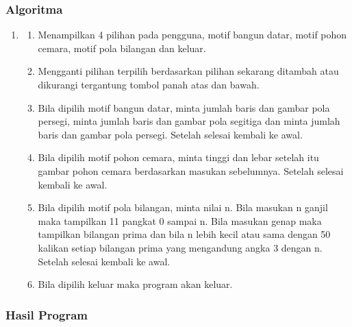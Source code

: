 \documentclass[../main.tex]{subfiles}
\begin{document}
    \subsubsection{Algoritma}
    \begin{enumerate}
        \item []
        \begin{enumerate}
            \item{Menampilkan 4 pilihan pada pengguna, motif bangun datar, motif pohon cemara, motif pola bilangan dan keluar.}
            \item{Mengganti pilihan terpilih berdasarkan pilihan sekarang ditambah atau dikurangi tergantung tombol panah atas dan bawah.}
            \item{Bila dipilih motif bangun datar, minta jumlah baris dan gambar pola persegi, minta jumlah baris dan gambar pola segitiga dan minta jumlah baris dan gambar pola persegi. Setelah selesai kembali ke awal.}
            \item{Bila dipilih motif pohon cemara, minta tinggi dan lebar setelah itu gambar pohon cemara berdasarkan masukan sebelumnya. Setelah selesai kembali ke awal.}
            \item{Bila dipilih motif pola bilangan, minta nilai n. Bila masukan n ganjil maka tampilkan 11 pangkat 0 sampai n. Bila masukan genap maka tampilkan bilangan prima dan bila n lebih kecil atau sama dengan 50 kalikan setiap bilangan prima yang mengandung angka 3 dengan n. Setelah selesai kembali ke awal.}
            \item{Bila dipilih keluar maka program akan keluar.}
        \end{enumerate}
    \end{enumerate}

    \subsubsection{{\Flowchart}}

    \subsubsection{{\Source} {\sCode}}

    \subsubsection{Hasil Program}
\end{document}
